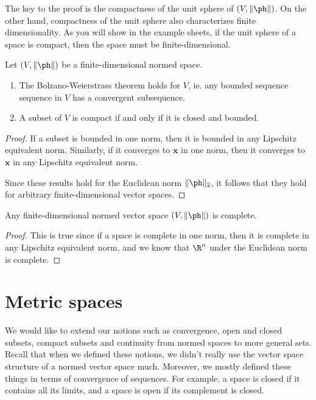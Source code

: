 \documentclass[a4paper]{article}
\begin{document}
The key to the proof is the compactness of the unit sphere of $(V, \|\ph\|)$. On the other hand, compactness of the unit sphere also characterizes finite dimensionality. As you will show in the example sheets, if the unit sphere of a space is compact, then the space must be finite-dimensional.

\begin{cor}
  Let $(V, \|\ph\|)$ be a finite-dimensional normed space.
  \begin{enumerate}
    \item The Bolzano-Weierstrass theorem holds for $V$, ie. any bounded sequence sequence in $V$ has a convergent subsequence.
    \item A subset of $V$ is compact if and only if it is closed and bounded.
  \end{enumerate}
\end{cor}

\begin{proof}
  If a subset is bounded in one norm, then it is bounded in any Lipschitz equivalent norm. Similarly, if it converges to $\mathbf{x}$ in one norm, then it converges to $\mathbf{x}$ in any Lipschitz equivalent norm.

  Since these results hold for the Euclidean norm $\|\ph\|_2$, it follows that they hold for arbitrary finite-dimensional vector spaces.
\end{proof}

\begin{cor}
  Any finite-dimensional normed vector space $(V, \|\ph\|)$ is complete.
\end{cor}

\begin{proof}
  This is true since if a space is complete in one norm, then it is complete in any Lipschitz equivalent norm, and we know that $\R^n$ under the Euclidean norm is complete.
\end{proof}

\section{Metric spaces}
We would like to extend our notions such as convergence, open and closed subsets, compact subsets and continuity from normed spaces to more general sets. Recall that when we defined these notions, we didn't really use the vector space structure of a normed vector space much. Moreover, we mostly defined these things in terms of convergence of sequences. For example, a space is closed if it contains all its limits, and a space is open if its complement is closed.
\end{document}

